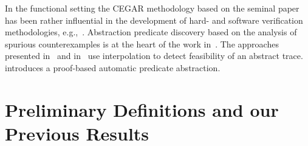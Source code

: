 \documentclass{eptcs}
\begin{document}
In the functional setting the CEGAR methodology based on the seminal 
paper~\cite{clarke00guided}
has been rather influential in the development of hard- and software 
verification methodologies, e.g.,~\cite{Ball02}.
Abstraction predicate discovery based on the analysis of 
spurious counterexamples is at the heart of the work 
in~\cite{Das02}.
The approaches presented in~\cite{Jhala05,millan06} and  
in~\cite{Henzinger04} use interpolation to detect feasibility of an 
abstract trace. \cite{millan03} introduces a
proof-based automatic predicate abstraction.



\section{Preliminary Definitions and our Previous Results}
\label{sec.ta}
\end{document}
